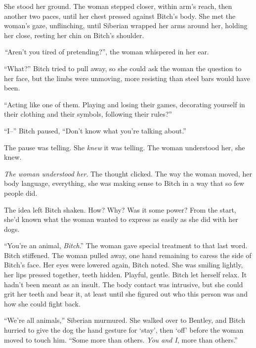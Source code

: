 She stood her ground.  The woman stepped closer, within arm's reach, then another two paces, until her chest pressed against Bitch's body.  She met the woman's gaze, unflinching, until Siberian wrapped her arms around her, holding her close, resting her chin on Bitch's shoulder.



\emph{``}Aren't you tired of pretending?'', the woman whispered in her ear.



``What?''  Bitch tried to pull away, so she could ask the woman the question to her face, but the limbs were unmoving, more resisting than steel bars would have been.



``Acting like one of them.  Playing and losing their games, decorating yourself in their clothing and their symbols, following their rules?''



``I--'' Bitch paused, ``Don't know what you're talking about.''



The pause was telling.  She \emph{knew} it was telling.  The woman understood her, she knew.



\emph{The woman understood her}.  The thought clicked.  The way the woman moved, her body language, everything, she was making sense to Bitch in a way that so few people did.



The idea left Bitch shaken.  How?  Why?  Was it some power?  From the start, she'd known what the woman wanted to express as easily as she did with her dogs.



``You're an animal, \emph{Bitch}.'' The woman gave special treatment to that last word.  Bitch stiffened.  The woman pulled away, one hand remaining to caress the side of Bitch's face.  Her eyes were lowered again, Bitch noted.  She was smiling lightly, her lips pressed together, teeth hidden.  Playful, gentle.  Bitch let herself relax.  It hadn't been meant as an insult.  The body contact was intrusive, but she could grit her teeth and bear it, at least until she figured out who this person was and how she could fight back.



``We're all animals,'' Siberian murmured.  She walked over to Bentley, and Bitch hurried to give the dog the hand gesture for `stay', then `off' before the woman moved to touch him.  ``Some more than others.  \emph{You and I}, more than others.''



